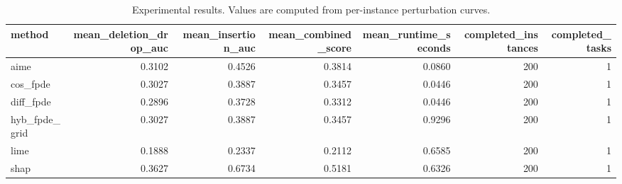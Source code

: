\begin{table}[t]
\caption{Experimental results. Values are computed from per-instance perturbation curves.}
\label{tab:main_results_computed}
\centering
\begin{tabular}{lrrrrrr}
\toprule
method & mean\_deletion\_drop\_auc & mean\_insertion\_auc & mean\_combined\_score & mean\_runtime\_seconds & completed\_instances & completed\_tasks \\
\midrule
aime & 0.3102 & 0.4526 & 0.3814 & 0.0860 & 200 & 1 \\
cos\_fpde & 0.3027 & 0.3887 & 0.3457 & 0.0446 & 200 & 1 \\
diff\_fpde & 0.2896 & 0.3728 & 0.3312 & 0.0446 & 200 & 1 \\
hyb\_fpde\_grid & 0.3027 & 0.3887 & 0.3457 & 0.9296 & 200 & 1 \\
lime & 0.1888 & 0.2337 & 0.2112 & 0.6585 & 200 & 1 \\
shap & 0.3627 & 0.6734 & 0.5181 & 0.6326 & 200 & 1 \\
\bottomrule
\end{tabular}

\end{table}
